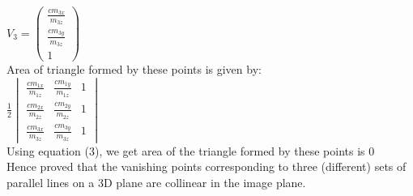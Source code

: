 \documentclass{article}
\begin{document}
	\begin{math}V_3=\begin{pmatrix}\frac{cm_{3x}}{m_{3z}}\\\frac{cm_{3y}}{m_{3z}}\\1\end{pmatrix}\end{math}
	\\
	Area of triangle formed by these points is given by:
	\\
	\begin{math}\frac{1}{2}\begin{vmatrix}\frac{cm_{1x}}{m_{1z}}&\frac{cm_{1y}}{m_{1z}}&1\\\frac{cm_{2x}}{m_{2z}}&\frac{cm_{2y}}{m_{2z}}&1\\\frac{cm_{3x}}{m_{3z}}&\frac{cm_{3y}}{m_{3z}}&1\end{vmatrix} \end{math}
	\\
	Using equation (3), we get area of the triangle formed by these points is 0
	\\
	Hence proved that the vanishing points corresponding to three (different) sets of parallel lines on a 3D plane are collinear in the image plane.
\end{document}
